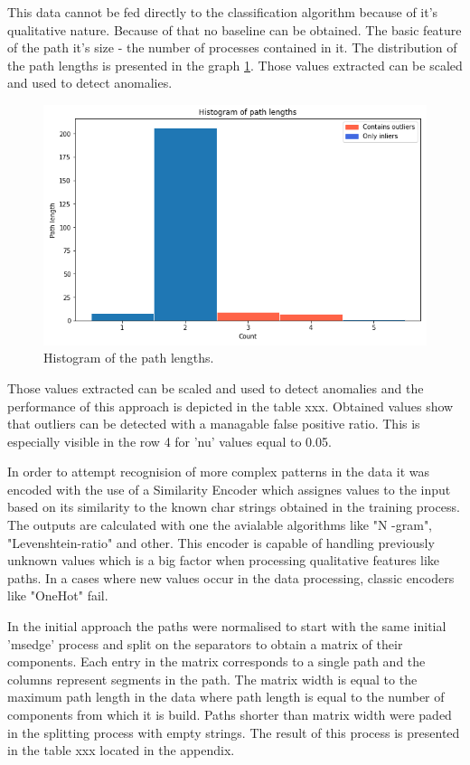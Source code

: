 \documentclass[a4paper,twoside,12pt]{book}
\begin{document}
This data cannot be fed directly to the classification algorithm because of it's 
qualitative nature. Because of that no baseline can be obtained. The basic feature
of the path it's size - the number of processes contained in it. The distribution
of the path lengths is presented in the graph \ref{fig:pathLenHist}. Those values
extracted can be scaled and used to detect anomalies.

\begin{figure}
	\centering
	\includegraphics[scale=0.9]{images/pathLenHist}
	\caption{Histogram of the path lengths.}
	\label{fig:pathLenHist}
 \end{figure}

Those values extracted can be scaled and used to detect anomalies and the performance
of this approach is depicted in the table xxx. Obtained values show that outliers can be
detected with a managable false positive ratio. This is especially visible in the row 
4 for 'nu' values equal to 0.05. 

In order to attempt recognision of more complex patterns in the data it was encoded with
the use of a Similarity Encoder which assignes values to the input based on its similarity 
to the known char strings obtained in the training process. The outputs are calculated with 
one the avialable algorithms like "N -gram", "Levenshtein-ratio" and other. This encoder is
capable of handling previously unknown values which is a big factor when processing 
qualitative features like paths. In a cases where new values occur in the data processing,
classic encoders like "OneHot" fail. 

In the initial approach the paths were normalised to start with the same initial 'msedge' 
process and split on the separators to obtain a matrix of their components. Each entry in the
matrix corresponds to a single path and the columns represent segments in the path. The matrix
width is equal to the maximum path length in the data where path length is equal to the number
of components from which it is build. Paths shorter than matrix width were paded in the splitting
process with empty strings. The result of this process is presented in the table xxx located in
the appendix. 
\end{document}
